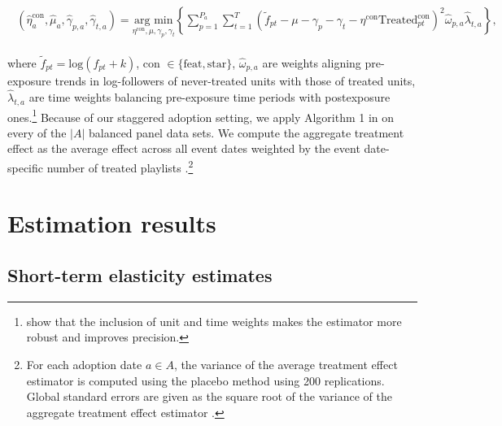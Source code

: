 \documentclass[12pt, a4paper, leqno]{article}
\begin{document}
\begin{align} 
\begin{split} 
\left(\hat{\eta}_a^{\text{con}}, \hat{\mu}_a, \hat{\gamma}_{p,a}, \hat{\gamma}_{t,a}\right) = \underset{\eta^{\text{con}},\mu, \gamma_{p}, \gamma_{t}}{\text{arg min}} \left\{\sum_{p=1}^{P_a} \sum_{t=1}^T \left( \tilde{f}_{pt} - \mu - \gamma_{p} - \gamma_{t} - \eta^{\text{con}} \text{Treated}_{pt}^{\text{con}} \right)^2 \hat{\omega}_{p,a} \hat{\lambda}_{t,a} \right\}, \end{split} 
\label{SDID_speci}
\end{align} 

where $\tilde{f}_{pt} = \text{log}(f_{pt}+k)$, con $\in \{\text{feat},\text{star}\}$, $\hat{\omega}_{p,a}$ are weights aligning pre-exposure trends in log-followers of never-treated units with those of treated units, $\hat{\lambda}_{t,a}$ are time weights balancing pre-exposure time periods with postexposure ones.\footnote{\cite{SDiD_AER_Arkhangelsky_21} show that the inclusion of unit and time weights makes the estimator more robust and improves precision.} Because of our staggered adoption setting, we apply Algorithm 1 in \cite{SDiD_AER_Arkhangelsky_21} on every of the $|A|$ balanced panel data sets. We compute the aggregate treatment effect as the average effect across all event dates weighted by the event date-specific number of treated playlists \citep{SDiD_AER_Arkhangelsky_21}.\footnote{For each adoption date $a \in A$, the variance of the average treatment effect estimator is computed using the placebo method \citep[Algorithm 4 in][]{SDiD_AER_Arkhangelsky_21} using 200 replications. Global standard errors are given as the square root of the variance of the aggregate treatment effect estimator \citep[e.g.,][]{Imbens_JoEconmetrics_22}.}


\section{Estimation results}
\label{results}



\subsection{Short-term elasticity estimates}
\end{document}
